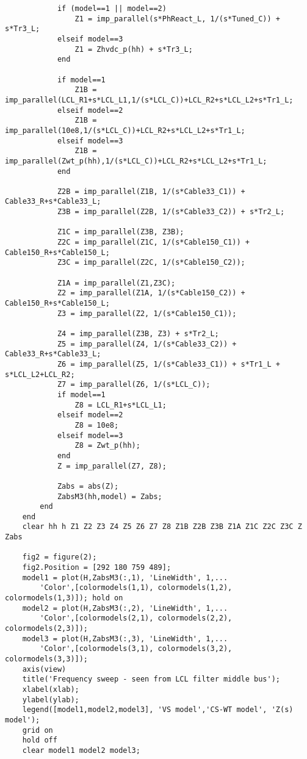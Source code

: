 \begin{appendices}
\begin{lstlisting}
            if (model==1 || model==2)
                Z1 = imp_parallel(s*PhReact_L, 1/(s*Tuned_C)) + s*Tr3_L;
            elseif model==3
                Z1 = Zhvdc_p(hh) + s*Tr3_L;
            end
            
            if model==1
                Z1B = imp_parallel(LCL_R1+s*LCL_L1,1/(s*LCL_C))+LCL_R2+s*LCL_L2+s*Tr1_L;
            elseif model==2
                Z1B = imp_parallel(10e8,1/(s*LCL_C))+LCL_R2+s*LCL_L2+s*Tr1_L;
            elseif model==3
                Z1B = imp_parallel(Zwt_p(hh),1/(s*LCL_C))+LCL_R2+s*LCL_L2+s*Tr1_L;
            end
            
            Z2B = imp_parallel(Z1B, 1/(s*Cable33_C1)) + Cable33_R+s*Cable33_L;
            Z3B = imp_parallel(Z2B, 1/(s*Cable33_C2)) + s*Tr2_L;

            Z1C = imp_parallel(Z3B, Z3B);
            Z2C = imp_parallel(Z1C, 1/(s*Cable150_C1)) + Cable150_R+s*Cable150_L;
            Z3C = imp_parallel(Z2C, 1/(s*Cable150_C2));

            Z1A = imp_parallel(Z1,Z3C);
            Z2 = imp_parallel(Z1A, 1/(s*Cable150_C2)) + Cable150_R+s*Cable150_L;
            Z3 = imp_parallel(Z2, 1/(s*Cable150_C1));

            Z4 = imp_parallel(Z3B, Z3) + s*Tr2_L;
            Z5 = imp_parallel(Z4, 1/(s*Cable33_C2)) + Cable33_R+s*Cable33_L;
            Z6 = imp_parallel(Z5, 1/(s*Cable33_C1)) + s*Tr1_L + s*LCL_L2+LCL_R2;
            Z7 = imp_parallel(Z6, 1/(s*LCL_C));
            if model==1
                Z8 = LCL_R1+s*LCL_L1;
            elseif model==2
                Z8 = 10e8;
            elseif model==3
                Z8 = Zwt_p(hh);
            end
            Z = imp_parallel(Z7, Z8);

            Zabs = abs(Z);
            ZabsM3(hh,model) = Zabs;
        end
    end
    clear hh h Z1 Z2 Z3 Z4 Z5 Z6 Z7 Z8 Z1B Z2B Z3B Z1A Z1C Z2C Z3C Z Zabs

    fig2 = figure(2);
    fig2.Position = [292 180 759 489];
    model1 = plot(H,ZabsM3(:,1), 'LineWidth', 1,...
        'Color',[colormodels(1,1), colormodels(1,2), colormodels(1,3)]); hold on
    model2 = plot(H,ZabsM3(:,2), 'LineWidth', 1,...
        'Color',[colormodels(2,1), colormodels(2,2), colormodels(2,3)]);
    model3 = plot(H,ZabsM3(:,3), 'LineWidth', 1,...
        'Color',[colormodels(3,1), colormodels(3,2), colormodels(3,3)]);
    axis(view)
    title('Frequency sweep - seen from LCL filter middle bus');
    xlabel(xlab);
    ylabel(ylab);
    legend([model1,model2,model3], 'VS model','CS-WT model', 'Z(s) model');
    grid on
    hold off
    clear model1 model2 model3;
    

\end{lstlisting}
\end{appendices}

